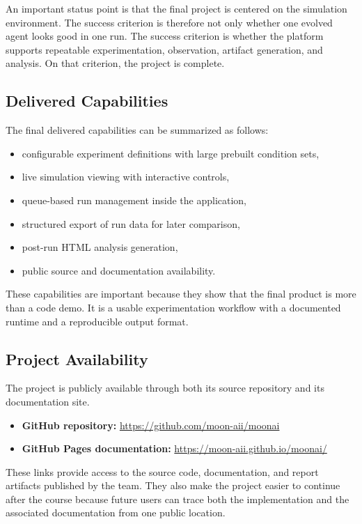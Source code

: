 An important status point is that the final project is centered on the simulation environment.
The success criterion is therefore not only whether one evolved agent looks good in one run. The
success criterion is whether the platform supports repeatable experimentation, observation,
artifact generation, and analysis. On that criterion, the project is complete.

\subsection{Delivered Capabilities}

The final delivered capabilities can be summarized as follows:

\begin{itemize}[nosep]
  \item configurable experiment definitions with large prebuilt condition sets,
  \item live simulation viewing with interactive controls,
  \item queue-based run management inside the application,
  \item structured export of run data for later comparison,
  \item post-run HTML analysis generation,
  \item public source and documentation availability.
\end{itemize}

These capabilities are important because they show that the final product is more than a code
demo. It is a usable experimentation workflow with a documented runtime and a reproducible output
format.

\subsection{Project Availability}

The project is publicly available through both its source repository and its documentation site.

\begin{itemize}[leftmargin=*]
  \item \textbf{GitHub repository:} \url{https://github.com/moon-aii/moonai}
  \item \textbf{GitHub Pages documentation:} \url{https://moon-aii.github.io/moonai/}
\end{itemize}

These links provide access to the source code, documentation, and report artifacts published by
the team. They also make the project easier to continue after the course because future users can
trace both the implementation and the associated documentation from one public location.

